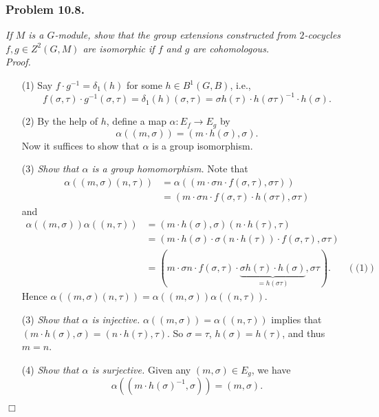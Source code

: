 \documentclass{article}
\begin{document}



\subsubsection*{Problem 10.8.}
\emph{If $M$ is a $G$-module,
show that the group extensions constructed from $2$-cocycles
$f, g \in Z^2(G,M)$ are isomorphic if $f$ and $g$ are cohomologous.} \\



\emph{Proof.}
\begin{enumerate}
\item[(1)]
  Say $f \cdot g^{-1} = \delta_1(h)$ for some $h \in B^{1}(G,B)$, i.e.,
  \[
    f(\sigma,\tau) \cdot g^{-1}(\sigma,\tau)
    = \delta_1(h)(\sigma,\tau)
    = \sigma h(\tau) \cdot h(\sigma\tau)^{-1} \cdot h(\sigma).
  \]

\item[(2)]
  By the help of $h$, define a map $\alpha: E_f \to E_g$ by
  \[
    \alpha((m,\sigma)) = (m \cdot h(\sigma), \sigma).
  \]
  Now it suffices to show that $\alpha$ is a group isomorphism.

\item[(3)]
  \emph{Show that $\alpha$ is a group homomorphism.}
  Note that
  \begin{align*}
    \alpha((m,\sigma)(n,\tau))
    &= \alpha((m \cdot \sigma n \cdot f(\sigma,\tau), \sigma\tau)) \\
    &= (m \cdot \sigma n \cdot f(\sigma,\tau) \cdot h(\sigma\tau), \sigma\tau)
  \end{align*}
  and
  \begin{align*}
    \alpha((m,\sigma))\alpha((n,\tau))
    &= (m \cdot h(\sigma), \sigma)(n \cdot h(\tau), \tau) \\
    &= (m \cdot h(\sigma) \cdot \sigma(n \cdot h(\tau)) \cdot f(\sigma,\tau), \sigma\tau) \\
    &= (m \cdot \sigma n \cdot f(\sigma,\tau) \cdot
        \underbrace{\sigma h(\tau) \cdot h(\sigma)}_{= h(\sigma\tau)}, \sigma\tau).
      &(\text{(1)})
  \end{align*}
  Hence $\alpha((m,\sigma)(n,\tau)) = \alpha((m,\sigma))\alpha((n,\tau))$.

\item[(3)]
  \emph{Show that $\alpha$ is injective.}
  $\alpha((m,\sigma)) = \alpha((n,\tau))$ implies that
  $(m \cdot h(\sigma), \sigma) = (n \cdot h(\tau),\tau)$.
  So $\sigma = \tau$, $h(\sigma) = h(\tau)$, and thus $m = n$.
  
\item[(4)]
  \emph{Show that $\alpha$ is surjective.}
  Given any $(m,\sigma) \in E_g$, we have
  \[
    \alpha((m \cdot h(\sigma)^{-1}, \sigma)) = (m, \sigma).
  \]
\end{enumerate}
$\Box$ \\\\
\end{document}
